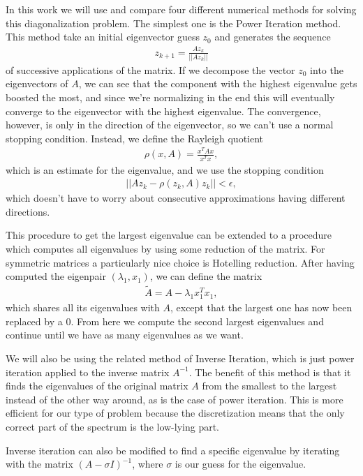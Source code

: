 \documentclass[10pt,a4paper,twocolumn]{article}
\begin{document}
In this work we will use and compare four different numerical methods for solving this diagonalization problem. The simplest one is the Power Iteration method. This method take an initial eigenvector guess $z_0$ and generates the sequence
%
\begin{align}
    z_{k+1} = \frac{A z_k}{||A z_k||}
\end{align}
%
of successive applications of the matrix. If we decompose the vector $z_0$ into the eigenvectors of $A$, we can see that the component with the highest eigenvalue gets boosted the most, and since we're normalizing in the end this will eventually converge to the eigenvector with the highest eigenvalue. The convergence, however, is only in the direction of the eigenvector, so we can't use a normal stopping condition. Instead, we define the Rayleigh quotient
%
\begin{align}
    \rho(x, A) = \frac{x^T A x}{x^T x},
\end{align}
%
which is an estimate for the eigenvalue, and we use the stopping condition
%
\begin{align}
    ||A z_k - \rho(z_k, A) z_k|| < \epsilon,
\end{align}
%
which doesn't have to worry about consecutive approximations having different directions.

This procedure to get the largest eigenvalue can be extended to a procedure which computes all eigenvalues by using some reduction of the matrix. For symmetric matrices a particularly nice choice is Hotelling reduction. After having computed the eigenpair $(\lambda_1, x_1)$, we can define the matrix
%
\begin{align}
    \tilde{A} = A - \lambda_1 x_1^T x_1,
\end{align}
%
which shares all its eigenvalues with $A$, except that the largest one has now been replaced by a $0$. From here we compute the second largest eigenvalues and continue until we have as many eigenvalues as we want.

We will also be using the related method of Inverse Iteration, which is just power iteration applied to the inverse matrix $A^{-1}$. The benefit of this method is that it finds the eigenvalues of the original matrix $A$ from the smallest to the largest instead of the other way around, as is the case of power iteration. This is more efficient for our type of problem because the discretization means that the only correct part of the spectrum is the low-lying part. 

Inverse iteration can also be modified to find a specific eigenvalue by iterating with the matrix $(A - \sigma I)^{-1}$, where $\sigma$ is our guess for the eigenvalue.
\end{document}
